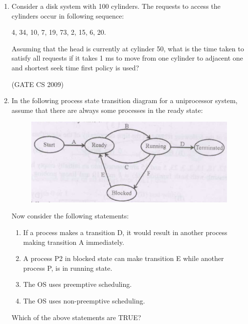 \documentclass[a4paper, 11pt]{article}
\begin{document}
\begin{enumerate}
    \item Consider a disk system with 100 cylinders. The requests to access the cylinders occur in following sequence:
    \begin{center}
        4, 34, 10, 7, 19, 73, 2, 15, 6, 20.
    \end{center}
    Assuming that the head is currently at cylinder 50, what is the time taken to satisfy all requests if it takes 1 ms to move from one cylinder to adjacent one and shortest seek time first policy is used?\\
    \begin{enumerate}
    \end{enumerate}

    \hfill (GATE CS 2009)

    \item In the following process state transition diagram for a uniprocessor system, assume that there are always some processes in the ready state:\\
    \begin{figure}[H]
        \centering
        \includegraphics[width=\columnwidth]{figs/q32.png}
        \caption{}
        \label{fig:placeholder}
    \end{figure}

    Now consider the following statements:

    \begin{enumerate}[label=\Roman*]
        \item If a process makes a transition D, it would result in another process making transition A immediately.
        \item A process P2 in blocked state can make transition E while another process P, is in running state.
        \item The OS uses preemptive scheduling.
        \item The OS uses non-preemptive scheduling.
    \end{enumerate}
    Which of the above statements are TRUE?\\


\end{enumerate}
\end{document}
